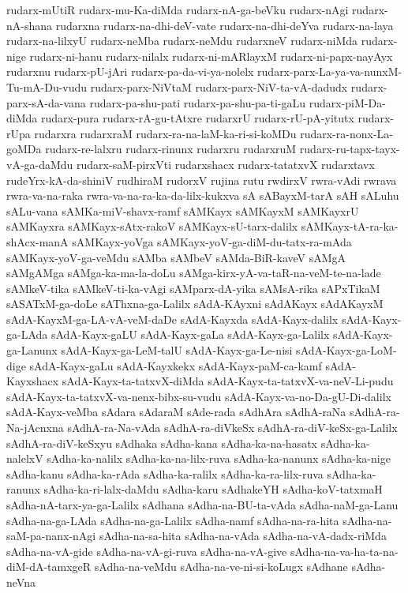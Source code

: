 {rudarx-mUtiR
rudarx-mu-Ka-diMda
rudarx-nA-ga-beVku
rudarx-nAgi
rudarx-nA-shana
rudarxna
rudarx-na-dhi-deV-vate
rudarx-na-dhi-deYva
rudarx-na-laya
rudarx-na-lilxyU
rudarx-neMba
rudarx-neMdu
rudarxneV
rudarx-niMda
rudarx-nige
rudarx-ni-hanu
rudarx-nilalx
rudarx-ni-mARlayxM
rudarx-ni-papx-nayAyx
rudarxnu
rudarx-pU-jAri
rudarx-pa-da-vi-ya-nolelx
rudarx-parx-La-ya-va-nunxM-Tu-mA-Du-vudu
rudarx-parx-NiVtaM
rudarx-parx-NiV-ta-vA-dadudx
rudarx-parx-sA-da-vana
rudarx-pa-shu-pati
rudarx-pa-shu-pa-ti-gaLu
rudarx-piM-Da-diMda
rudarx-pura
rudarx-rA-gu-tAtxre
rudarxrU
rudarx-rU-pA-yitutx
rudarx-rUpa
rudarxra
rudarxraM
rudarx-ra-na-laM-ka-ri-si-koMDu
rudarx-ra-nonx-La-goMDa
rudarx-re-lalxru
rudarx-rinunx
rudarxru
rudarxruM
rudarx-ru-tapx-tayx-vA-ga-daMdu
rudarx-saM-pirxVti
rudarxshacx
rudarx-tatatxvX
rudarxtavx
rudeYrx-kA-da-shiniV
rudhiraM
rudorxV
rujina
rutu
rwdirxV
rwra-vAdi
rwrava
rwra-va-na-raka
rwra-va-na-ra-ka-da-lilx-kukxva
sA
sABayxM-tarA
sAH
sALuhu
sALu-vana
sAMKa-miV-shavx-ramf
sAMKayx
sAMKayxM
sAMKayxrU
sAMKayxra
sAMKayx-sAtx-rakoV
sAMKayx-sU-tarx-dalilx
sAMKayx-tA-ra-ka-shAcx-manA
sAMKayx-yoVga
sAMKayx-yoV-ga-diM-du-tatx-ra-mAda
sAMKayx-yoV-ga-veMdu
sAMba
sAMbeV
sAMda-BiR-kaveV
sAMgA
sAMgAMga
sAMga-ka-ma-la-doLu
sAMga-kirx-yA-va-taR-na-veM-te-na-lade
sAMkeV-tika
sAMkeV-ti-ka-vAgi
sAMparx-dA-yika
sAMsA-rika
sAPxTikaM
sASATxM-ga-doLe
sAThxna-ga-Lalilx
sAdA-KAyxni
sAdAKayx
sAdAKayxM
sAdA-KayxM-ga-LA-vA-veM-daDe
sAdA-Kayxda
sAdA-Kayx-dalilx
sAdA-Kayx-ga-LAda
sAdA-Kayx-gaLU
sAdA-Kayx-gaLa
sAdA-Kayx-ga-Lalilx
sAdA-Kayx-ga-Lanunx
sAdA-Kayx-ga-LeM-talU
sAdA-Kayx-ga-Le-nisi
sAdA-Kayx-ga-LoM-dige
sAdA-Kayx-gaLu
sAdA-Kayxkekx
sAdA-Kayx-paM-ca-kamf
sAdA-Kayxshacx
sAdA-Kayx-ta-tatxvX-diMda
sAdA-Kayx-ta-tatxvX-va-neV-Li-pudu
sAdA-Kayx-ta-tatxvX-va-nenx-bibx-su-vudu
sAdA-Kayx-va-no-Da-gU-Di-dalilx
sAdA-Kayx-veMba
sAdara
sAdaraM
sAde-rada
sAdhAra
sAdhA-raNa
sAdhA-ra-Na-jAcnxna
sAdhA-ra-Na-vAda
sAdhA-ra-diVkeSx
sAdhA-ra-diV-keSx-ga-Lalilx
sAdhA-ra-diV-keSxyu
sAdhaka
sAdha-kana
sAdha-ka-na-hasatx
sAdha-ka-nalelxV
sAdha-ka-nalilx
sAdha-ka-na-lilx-ruva
sAdha-ka-nanunx
sAdha-ka-nige
sAdha-kanu
sAdha-ka-rAda
sAdha-ka-ralilx
sAdha-ka-ra-lilx-ruva
sAdha-ka-ranunx
sAdha-ka-ri-lalx-daMdu
sAdha-karu
sAdhakeYH
sAdha-koV-tatxmaH
sAdha-nA-tarx-ya-ga-Lalilx
sAdhana
sAdha-na-BU-ta-vAda
sAdha-naM-ga-Lanu
sAdha-na-ga-LAda
sAdha-na-ga-Lalilx
sAdha-namf
sAdha-na-ra-hita
sAdha-na-saM-pa-nanx-nAgi
sAdha-na-sa-hita
sAdha-na-vAda
sAdha-na-vA-dadx-riMda
sAdha-na-vA-gide
sAdha-na-vA-gi-ruva
sAdha-na-vA-give
sAdha-na-va-ha-ta-na-diM-dA-tamxgeR
sAdha-na-veMdu
sAdha-na-ve-ni-si-koLugx
sAdhane
sAdha-neVna
}
